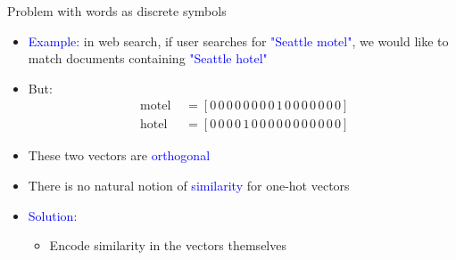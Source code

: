 \documentclass[usenames,dvipsnames,english]{beamer}
\begin{document}
\begin{frame}{Problem with words as discrete symbols}
\begin{itemize}
\setlength{\itemsep}{1.2em}

    \item \textcolor{blue}{Example:} in web search, if user searches for \textcolor{blue}{"Seattle motel"}, we would like to match documents containing \textcolor{blue}{"Seattle hotel"}
    
    \item But:
    \vspace{-5pt}
    \begin{align*}
        \text { motel } &= [0\,0\,0\,0\,0\,0\,0\,0\,1\,0\,0\,0\,0\,0\,0\,0] \\
        \text { hotel } &= [0\,0\,0\,0\,1\,0\,0\,0\,0\,0\,0\,0\,0\,0\,0\,0]
    \end{align*}
    \item These two vectors are \textcolor{blue}{orthogonal}
    \item There is no natural notion of \textcolor{blue}{similarity} for one-hot vectors
    \item \textcolor{blue}{Solution:}
    \begin{itemize}
    \vspace{5pt}
        \item Encode similarity in the vectors themselves
    \end{itemize}
    \end{itemize}
\end{frame}
\end{document}
